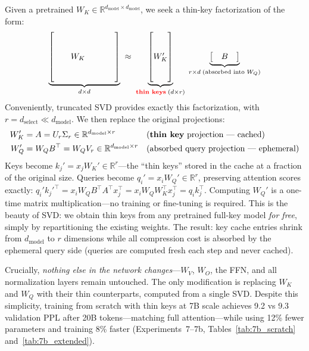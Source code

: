 \documentclass[11pt]{article}
\newcommand{\dmodel}{d_{\text{model}}}
\newcommand{\dselect}{d_{\text{select}}}
\begin{document}
Given a pretrained $W_K \in \mathbb{R}^{\dmodel \times \dmodel}$, we seek a thin-key factorization of the form:
\begin{equation}
\underbrace{
\begin{bmatrix} & & & \\ \\ \quad & W_K & \quad \\ \\ & & & \phantom{x} \end{bmatrix}
}_{d \times d}
\;\approx\;
\underbrace{
\begin{bmatrix} \\ \\ W_K' \\ \\ \phantom{x} \end{bmatrix}
}_{\text{\textcolor{red}{\textbf{thin keys}}}\; (d \times r)}
\;
\underbrace{
\begin{bmatrix} & B & \end{bmatrix}
}_{r \times d \;\text{(absorbed into } W_Q\text{)}}
\end{equation}
Conveniently, truncated SVD provides exactly this factorization, with $r = \dselect \ll \dmodel$. We then replace the original projections:
\begin{align}
W_K' &= A = U_r \Sigma_r \in \mathbb{R}^{\dmodel \times r} & &\text{(\textbf{thin key} projection --- cached)} \label{eq:thin_key} \\
W_Q' &= W_Q B^\top = W_Q V_r \in \mathbb{R}^{\dmodel \times r} & &\text{(absorbed query projection --- ephemeral)} \label{eq:absorbed_query}
\end{align}
Keys become $k_j' = x_j W_K' \in \mathbb{R}^r$---the ``thin keys'' stored in the cache at a fraction of the original size. Queries become $q_i' = x_i W_Q' \in \mathbb{R}^r$, preserving attention scores exactly: $q_i' k_j'^\top = x_i W_Q B^\top A^\top x_j^\top = x_i W_Q W_K^\top x_j^\top = q_i k_j^\top$. Computing $W_Q'$ is a one-time matrix multiplication---no training or fine-tuning is required. This is the beauty of SVD: we obtain thin keys from any pretrained full-key model \emph{for free}, simply by repartitioning the existing weights. The result: key cache entries shrink from $\dmodel$ to $r$ dimensions while all compression cost is absorbed by the ephemeral query side (queries are computed fresh each step and never cached).

Crucially, \emph{nothing else in the network changes}---$W_V$, $W_O$, the FFN, and all normalization layers remain untouched. The only modification is replacing $W_K$ and $W_Q$ with their thin counterparts, computed from a single SVD. Despite this simplicity, training from scratch with thin keys at 7B scale achieves 9.2 vs 9.3 validation PPL after 20B tokens---matching full attention---while using 12\% fewer parameters and training 8\% faster (Experiments~7--7b, Tables~\ref{tab:7b_scratch} and~\ref{tab:7b_extended}).
\end{document}
